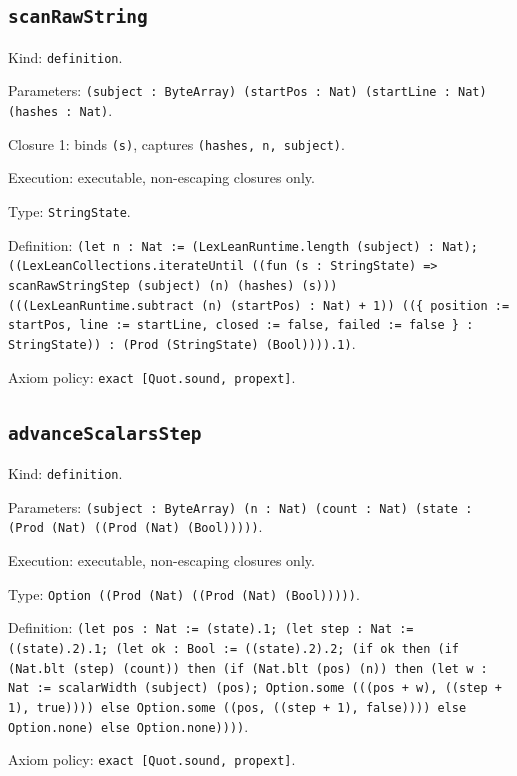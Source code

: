 \documentclass[11pt]{article}
\begin{document}
\subsection*{\texttt{scanRawString}}
\noindent Kind: \texttt{definition}.\par
\noindent Parameters: \texttt{(subject : ByteArray) (startPos : Nat) (startLine : Nat) (hashes : Nat)}.\par
\noindent Closure 1: binds \texttt{(s)}, captures \texttt{(hashes, n, subject)}.\par
\noindent Execution: executable, non-escaping closures only.\par
\noindent Type: \texttt{StringState}.\par
\noindent Definition: \texttt{(let n : Nat := (LexLeanRuntime.length (subject) : Nat); ((LexLeanCollections.iterateUntil ((fun (s : StringState) => scanRawStringStep (subject) (n) (hashes) (s))) (((LexLeanRuntime.subtract (n) (startPos) : Nat) + 1)) ((\{ position := startPos, line := startLine, closed := false, failed := false \} : StringState)) : (Prod (StringState) (Bool)))).1)}.\par
\noindent Axiom policy: \texttt{exact [Quot.sound, propext]}.\par
\subsection*{\texttt{advanceScalarsStep}}
\noindent Kind: \texttt{definition}.\par
\noindent Parameters: \texttt{(subject : ByteArray) (n : Nat) (count : Nat) (state : (Prod (Nat) ((Prod (Nat) (Bool)))))}.\par
\noindent Execution: executable, non-escaping closures only.\par
\noindent Type: \texttt{Option ((Prod (Nat) ((Prod (Nat) (Bool)))))}.\par
\noindent Definition: \texttt{(let pos : Nat := (state).1; (let step : Nat := ((state).2).1; (let ok : Bool := ((state).2).2; (if ok then (if (Nat.blt (step) (count)) then (if (Nat.blt (pos) (n)) then (let w : Nat := scalarWidth (subject) (pos); Option.some (((pos + w), ((step + 1), true)))) else Option.some ((pos, ((step + 1), false)))) else Option.none) else Option.none))))}.\par
\noindent Axiom policy: \texttt{exact [Quot.sound, propext]}.\par
\end{document}
